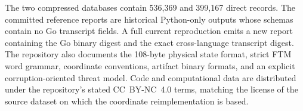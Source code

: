 The two compressed databases contain 536,369 and 399,167 direct records.  The
committed reference reports are historical Python-only outputs whose schemas
contain no Go transcript fields.  A full current reproduction emits a new
report containing the Go binary digest and the exact cross-language transcript
digest.  The repository also documents the 108-byte
physical state format, strict FTM word grammar, coordinate conventions,
artifact binary formats, and an explicit corruption-oriented threat model.
Code and computational data are distributed under the repository's stated
CC~BY-NC~4.0 terms, matching the license of the source dataset on which the
coordinate reimplementation is based.
